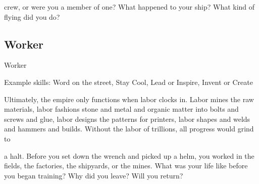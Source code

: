 crew, or were you a member of one? What happened to your ship? What kind of flying did you do?   
\subsection{Worker}
                                                      Worker  

Example skills: Word on the street, Stay Cool, Lead or Inspire, Invent or Create  

Ultimately, the empire only functions when labor clocks in. Labor mines the raw materials, labor fashions  
stone and metal and organic matter into bolts and screws and glue, labor designs the patterns for printers,  
labor shapes and welds and hammers and builds. Without the labor of trillions, all progress would grind to  

a halt. Before you set down the wrench and picked up a helm, you worked in the fields, the factories, the  
shipyards, or the mines. What was your life like before you began training? Why did you leave? Will you  
return?
 

                                                                                                                     
